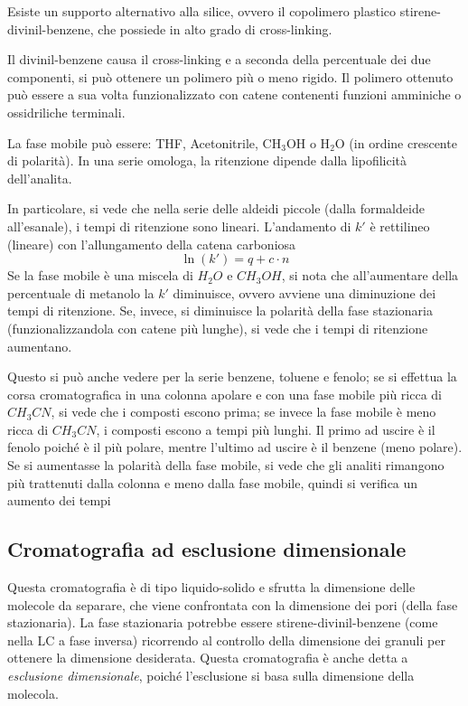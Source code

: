 Esiste un supporto alternativo alla silice, ovvero il copolimero plastico stirene-divinil-benzene, che possiede in alto grado di cross-linking.


Il divinil-benzene causa il cross-linking e a seconda della percentuale dei due componenti, si può ottenere un polimero più o meno rigido. Il polimero ottenuto può essere a sua volta funzionalizzato con catene contenenti funzioni amminiche o ossidriliche terminali.

La fase mobile può essere: THF, Acetonitrile, CH$_3$OH o H$_2$O (in ordine crescente di polarità). In una serie omologa, la ritenzione dipende dalla lipofilicità dell'analita.


In particolare, si vede che nella serie delle aldeidi piccole (dalla formaldeide all'esanale), i tempi di ritenzione sono lineari. L'andamento di $k'$ è rettilineo (lineare) con l'allungamento della catena carboniosa
\[
\ln (k') = q + c\cdot n
\]
Se la fase mobile è una miscela di $H_2O$ e $CH_3OH$, si nota che all'aumentare della percentuale di metanolo la $k'$ diminuisce, ovvero avviene una diminuzione dei tempi di ritenzione. Se, invece, si diminuisce la polarità della fase stazionaria (funzionalizzandola con catene più lunghe), si vede che i tempi di ritenzione aumentano.


Questo si può anche vedere per la serie benzene, toluene e fenolo; se si effettua la corsa cromatografica in una colonna apolare e con una fase mobile più ricca di $CH_3CN$, si vede che i composti escono prima; se invece la fase mobile è meno ricca di $CH_3CN$, i composti escono a tempi più lunghi. Il primo ad uscire è il fenolo poiché è il più polare, mentre l'ultimo ad uscire è il benzene (meno polare). Se si aumentasse la polarità della fase mobile, si vede che gli analiti rimangono più trattenuti dalla colonna e meno dalla fase mobile, quindi si verifica un aumento dei tempi

\subsection{Cromatografia ad esclusione dimensionale}
Questa cromatografia è di tipo liquido-solido e sfrutta la dimensione delle molecole da separare, che viene confrontata con la dimensione dei pori (della fase stazionaria). La fase stazionaria potrebbe essere stirene-divinil-benzene (come nella LC a fase inversa) ricorrendo al controllo della dimensione dei granuli per ottenere la dimensione desiderata. Questa cromatografia è anche detta a \emph{esclusione dimensionale}, poiché l'esclusione si basa sulla dimensione della molecola.

